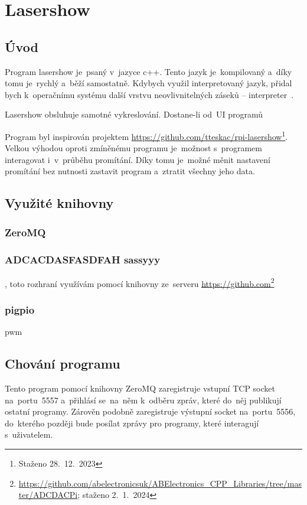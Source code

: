 \section{Lasershow}
\subsection{Úvod}

Program lasershow je~psaný v~jazyce c++. Tento jazyk je~kompilovaný a~díky tomu je~rychlý a~běží samostatně.
Kdybych využil interpretovaný jazyk, přidal bych k~operačnímu systému další vrstvu neovlivnitelných záseků -- interpreter~\cite{wiki-interpret}.

Lasershow obsluhuje samotné vykreslování. Dostane-li od~UI programů 

Program byl inspirován projektem \url{https://github.com/tteskac/rpi-lasershow}\footnote{Staženo 28.~12.~2023}.
Velkou výhodou oproti zmíněnému programu je~možnost s~programem interagovat i~v~průběhu promítání. Díky tomu je~možné měnit nastavení promítání bez nutnosti zastavit program a~ztratit všechny jeho data.

\subsection{Využité knihovny}
\subsubsection{ZeroMQ}
\subsubsection{ADCACDASFASDFAH sassyyy}
, toto rozhraní využívám pomocí knihovny ze~serveru \url{https://github.com}\footnote{\url{https://github.com/abelectronicsuk/ABElectronics_CPP_Libraries/tree/master/ADCDACPi}; staženo 2.~1.~2024}
\subsubsection{pigpio}
pwm

\subsection{Chování programu}
Tento program pomocí knihovny ZeroMQ zaregistruje vstupní TCP socket na~portu~5557 a~přihlásí se~na~něm k~odběru zpráv, které do~něj publikují ostatní programy. Zárověn podobně zaregistruje výstupní socket na~portu~5556, do~kterého později bude posílat zprávy pro programy, které interagují s~uživatelem.

